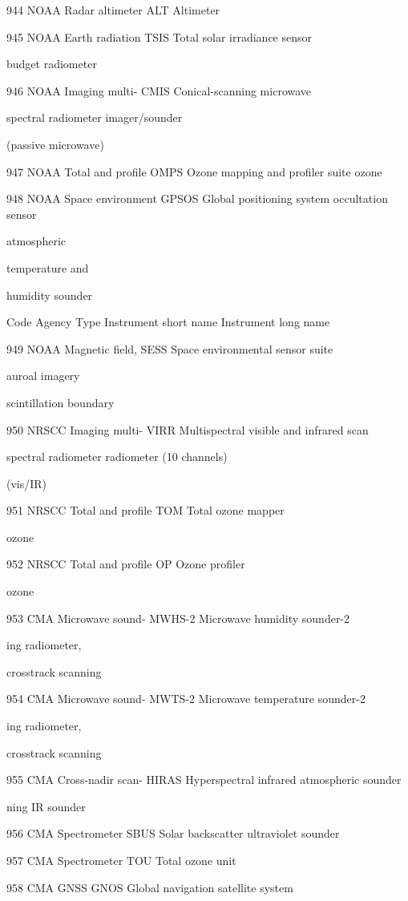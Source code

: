 944 NOAA Radar altimeter ALT Altimeter

945 NOAA Earth radiation TSIS Total solar irradiance sensor

budget radiometer

946 NOAA Imaging multi- CMIS Conical-scanning microwave

spectral radiometer imager/sounder

(passive microwave)

947 NOAA Total and profile OMPS Ozone mapping and profiler suite ozone

948 NOAA Space environment GPSOS Global positioning system occultation sensor

atmospheric

temperature and

humidity sounder

Code Agency Type Instrument short name Instrument long name

949 NOAA Magnetic field, SESS Space environmental sensor suite

auroal imagery

scintillation boundary

950 NRSCC Imaging multi- VIRR Multispectral visible and infrared scan

spectral radiometer radiometer (10 channels)

(vis/IR)

951 NRSCC Total and profile TOM Total ozone mapper

ozone

952 NRSCC Total and profile OP Ozone profiler

ozone

953 CMA Microwave sound- MWHS-2 Microwave humidity sounder-2

ing radiometer,

crosstrack scanning

954 CMA Microwave sound- MWTS-2 Microwave temperature sounder-2

ing radiometer,

crosstrack scanning

955 CMA Cross-nadir scan- HIRAS Hyperspectral infrared atmospheric sounder

ning IR sounder

956 CMA Spectrometer SBUS Solar backscatter ultraviolet sounder

957 CMA Spectrometer TOU Total ozone unit

958 CMA GNSS GNOS Global navigation satellite system

